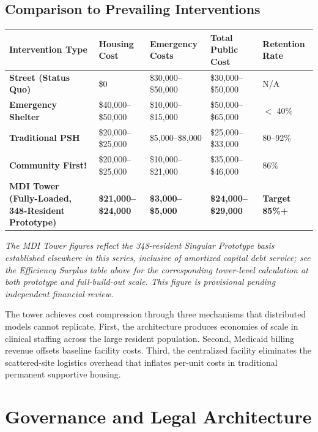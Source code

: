 \documentclass[12pt, letterpaper]{article}
\begin{document}
\subsection{Comparison to Prevailing Interventions}

\begin{table}[H]
\centering
\begin{tabularx}{\textwidth}{@{}lXXXX@{}}
\toprule
\textbf{Intervention Type} & \textbf{Housing Cost} & \textbf{Emergency Costs} & \textbf{Total Public Cost} & \textbf{Retention Rate} \\
\midrule
\textbf{Street (Status Quo)} & \$0 & \$30,000--\$50,000 & \$30,000--\$50,000 & N/A \\
\textbf{Emergency Shelter} & \$40,000--\$50,000 & \$10,000--\$15,000 & \$50,000--\$65,000 & $<$ 40\% \\
\textbf{Traditional PSH} & \$20,000--\$25,000 & \$5,000--\$8,000 & \$25,000--\$33,000 & 80--92\% \\
\textbf{Community First!} & \$20,000--\$25,000 & \$10,000--\$21,000 & \$35,000--\$46,000 & 86\% \\
\textbf{MDI Tower (Fully-Loaded, 348-Resident Prototype)} & \textbf{\$21,000--\$24,000} & \textbf{\$3,000--\$5,000} & \textbf{\$24,000--\$29,000} & \textbf{Target 85\%+} \\
\bottomrule
\end{tabularx}
\end{table}

\textit{The MDI Tower figures reflect the 348-resident Singular Prototype basis established elsewhere in this series, inclusive of amortized capital debt service; see the Efficiency Surplus table above for the corresponding tower-level calculation at both prototype and full-build-out scale. This figure is provisional pending independent financial review.}

The tower achieves cost compression through three mechanisms that distributed models cannot replicate. First, the architecture produces economies of scale in clinical staffing across the large resident population. Second, Medicaid billing revenue offsets baseline facility costs. Third, the centralized facility eliminates the scattered-site logistics overhead that inflates per-unit costs in traditional permanent supportive housing.

\newpage
\section{Governance and Legal Architecture}
\end{document}
